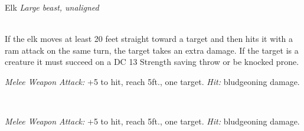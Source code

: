 \documentclass[10pt,twoside,twocolumn,openany]{book}
\begin{document}
\begin{monsterboxnobg}{Elk}
	\textit{Large beast, unaligned}\\
	\hline
	\basics[
		armorclass	= 10,
		hitpoints 		= \dice{2d10 + 2},
		speed		= {50 ft.}
	]
	\hline
	\stats[
		STR	= \stat{18},
		DEX	= \stat{10},
		CON	= \stat{12},
		INT	= \stat{2},
		WIS	= \stat{11},
		CHA	= \stat{7}
	]
	\hline
	\details[
		skills			= {},
		senses		= {passive Perception 10},
		languages		= {-},
		challenge		= 1/4
	]
	\hline \\[1mm]
	\begin{monsteraction}[Charge]
		If the elk moves at least 20 feet straight toward a target and then hits it with a ram attack on the same turn, the target takes an extra  damage. If the target is a creature it must succeed on a DC 13 Strength saving throw or be knocked prone.
	\end{monsteraction}
	\begin{monsteraction}[Ram]
		\textit{Melee Weapon Attack:} +5 to hit, reach 5ft., one target. \textit{Hit:}  bludgeoning damage.
	\end{monsteraction}\\
	\begin{monsteraction}[Hooves]
		\textit{Melee Weapon Attack:} +5 to hit, reach 5ft., one target. \textit{Hit:}  bludgeoning damage.
	\end{monsteraction}
\end{monsterboxnobg}
\end{document}
